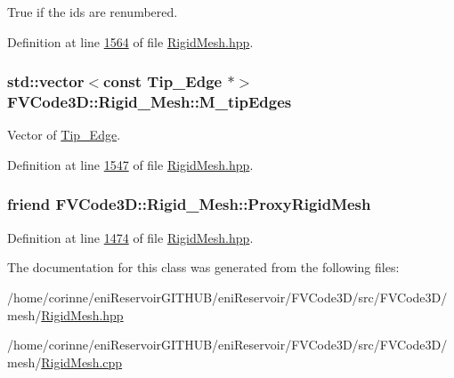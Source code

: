 True if the ids are renumbered. 



Definition at line \hyperlink{RigidMesh_8hpp_source_l01564}{1564} of file \hyperlink{RigidMesh_8hpp_source}{Rigid\+Mesh.\+hpp}.

\subsubsection[{\texorpdfstring{M\+\_\+tip\+Edges}{M_tipEdges}}]{\setlength{\rightskip}{0pt plus 5cm}std\+::vector$<$const {\bf Tip\+\_\+\+Edge} $\ast$$>$ F\+V\+Code3\+D\+::\+Rigid\+\_\+\+Mesh\+::\+M\+\_\+tip\+Edges\hspace{0.3cm}{\ttfamily [protected]}}\hypertarget{classFVCode3D_1_1Rigid__Mesh_a973940e6cd68e9980afec97fe94a70f4}{}\label{classFVCode3D_1_1Rigid__Mesh_a973940e6cd68e9980afec97fe94a70f4}


Vector of \hyperlink{classFVCode3D_1_1Rigid__Mesh_1_1Tip__Edge}{Tip\+\_\+\+Edge}. 



Definition at line \hyperlink{RigidMesh_8hpp_source_l01547}{1547} of file \hyperlink{RigidMesh_8hpp_source}{Rigid\+Mesh.\+hpp}.

\subsubsection[{\texorpdfstring{Proxy\+Rigid\+Mesh}{ProxyRigidMesh}}]{\setlength{\rightskip}{0pt plus 5cm}friend F\+V\+Code3\+D\+::\+Rigid\+\_\+\+Mesh\+::\+Proxy\+Rigid\+Mesh}\hypertarget{classFVCode3D_1_1Rigid__Mesh_aae8669ab0591db87f71f855bbfd74c09}{}\label{classFVCode3D_1_1Rigid__Mesh_aae8669ab0591db87f71f855bbfd74c09}


Definition at line \hyperlink{RigidMesh_8hpp_source_l01474}{1474} of file \hyperlink{RigidMesh_8hpp_source}{Rigid\+Mesh.\+hpp}.



The documentation for this class was generated from the following files\+:\begin{DoxyCompactItemize}
\item 
/home/corinne/eni\+Reservoir\+G\+I\+T\+H\+U\+B/eni\+Reservoir/\+F\+V\+Code3\+D/src/\+F\+V\+Code3\+D/mesh/\hyperlink{RigidMesh_8hpp}{Rigid\+Mesh.\+hpp}\item 
/home/corinne/eni\+Reservoir\+G\+I\+T\+H\+U\+B/eni\+Reservoir/\+F\+V\+Code3\+D/src/\+F\+V\+Code3\+D/mesh/\hyperlink{RigidMesh_8cpp}{Rigid\+Mesh.\+cpp}\end{DoxyCompactItemize}
